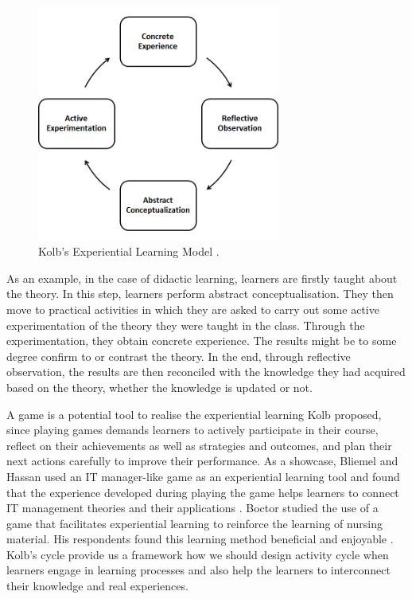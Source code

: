\documentclass[12pt, a4paper]{report}
\begin{document}
\begin{figure}[ht]
\centering
\includegraphics[width=8cm]{kolb}
\caption{Kolb's Experiential Learning Model \cite{kolb2014experiential}.}
\label{kolb}
\end{figure}

As an example, in the case of didactic learning, learners are firstly taught about the theory. In this step, learners perform abstract conceptualisation. They then move to practical activities in which they are asked to carry out some active experimentation of the theory they were taught in the class. Through the experimentation, they obtain concrete experience. The results might be to some degree confirm to or contrast the theory. In the end, through reflective observation, the results are then reconciled with the knowledge they had acquired based on the theory, whether the knowledge is updated or not. 

A game is a potential tool to realise the experiential learning Kolb proposed, since playing games demands learners to actively participate in their course, reflect on their achievements as well as strategies and outcomes, and plan their next actions carefully to improve their performance. As a showcase, Bliemel and Hassan used an IT manager-like game as an experiential learning tool and found that the experience developed during playing the game helps learners to connect IT management theories and their applications \cite{bliemel2014game}. Boctor studied the use of a game that facilitates experiential learning to reinforce the learning of nursing material. His respondents found this learning method beneficial and enjoyable \cite{boctor2013active}. Kolb's cycle provide us a framework how we should design activity cycle when learners engage in learning processes and also help the learners to interconnect their knowledge and real experiences. 
 
\end{document}
